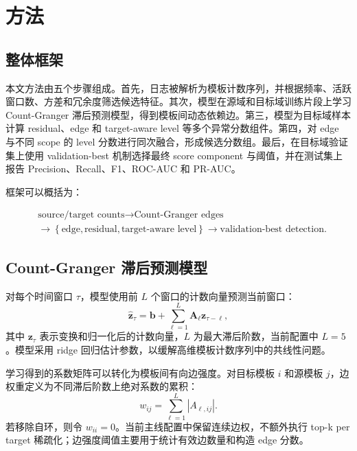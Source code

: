 \documentclass[UTF8,a4paper,zihao=-4]{ctexart}
\begin{document}
\section{方法}

\subsection{整体框架}

本文方法由五个步骤组成。首先，日志被解析为模板计数序列，并根据频率、活跃窗口数、方差和冗余度筛选候选特征。其次，模型在源域和目标域训练片段上学习 Count-Granger 滞后预测模型，得到模板间动态依赖边。第三，模型为目标域样本计算 residual、edge 和 target-aware level 等多个异常分数组件。第四，对 edge 与不同 scope 的 level 分数进行同次融合，形成候选分数组。最后，在目标域验证集上使用 validation-best 机制选择最终 score component 与阈值，并在测试集上报告 Precision、Recall、F1、ROC-AUC 和 PR-AUC。

框架可以概括为：

\begin{equation}
\begin{aligned}
&\text{source/target counts} \rightarrow \text{Count-Granger edges} \\
&\rightarrow \left\{\text{edge},\text{residual},\text{target-aware level}\right\}
\rightarrow \text{validation-best detection}.
\end{aligned}
\end{equation}

\subsection{Count-Granger 滞后预测模型}

对每个时间窗口 $\tau$，模型使用前 $L$ 个窗口的计数向量预测当前窗口：
\begin{equation}
  \hat{\mathbf{z}}_{\tau} = \mathbf{b} + \sum_{\ell=1}^{L} \mathbf{A}_{\ell}\mathbf{z}_{\tau-\ell},
\end{equation}
其中 $\mathbf{z}_{\tau}$ 表示变换和归一化后的计数向量，$L$ 为最大滞后阶数，当前配置中 $L=5$。模型采用 ridge 回归估计参数，以缓解高维模板计数序列中的共线性问题。

学习得到的系数矩阵可以转化为模板间有向边强度。对目标模板 $i$ 和源模板 $j$，边权重定义为不同滞后阶数上绝对系数的累积：
\begin{equation}
  w_{ij} = \sum_{\ell=1}^{L} |A_{\ell,ij}|.
\end{equation}
若移除自环，则令 $w_{ii}=0$。当前主线配置中保留连续边权，不额外执行 top-k per target 稀疏化；边强度阈值主要用于统计有效边数量和构造 edge 分数。
\end{document}
